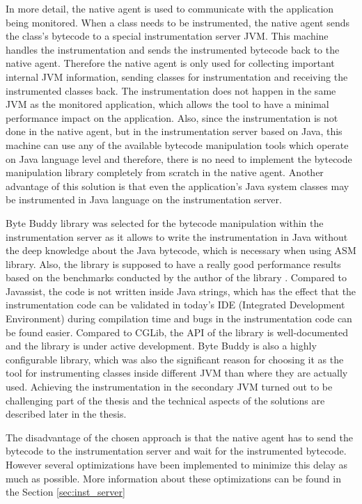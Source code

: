 In more detail, the native agent is used to communicate with the application being monitored. When a class needs to be instrumented, the native agent sends the class's bytecode to a special instrumentation server JVM. This machine handles the instrumentation and sends the instrumented bytecode back to the native agent. Therefore the native agent is only used for collecting important internal JVM information, sending classes for instrumentation and receiving the instrumented classes back. The instrumentation does not happen in the same JVM as the monitored application, which allows the tool to have a minimal performance impact on the application. Also, since the instrumentation is not done in the native agent, but in the instrumentation server based on Java, this machine can use any of the available bytecode manipulation tools which operate on Java language level and therefore, there is no need to implement the bytecode manipulation library completely from scratch in the native agent. Another advantage of this solution is that even the application's Java system classes may be instrumented in Java language on the instrumentation server.

Byte Buddy library was selected for the bytecode manipulation within the instrumentation server  as it allows to write the instrumentation in Java without the deep knowledge about the Java bytecode, which is necessary when using ASM library. Also, the library is supposed to have a really good performance results based on the benchmarks conducted by the author of the library \cite{ByteBuddy_Perf}. Compared to Javassist, the code is not written inside Java strings, which has the effect that the instrumentation code can be validated in today's IDE (Integrated Development Environment) during compilation time and bugs in the instrumentation code can be found easier. Compared to CGLib, the API of the library is well-documented and the library is under active development. Byte Buddy is also a highly configurable library, which was also the significant reason for choosing it as the tool for instrumenting classes inside different JVM than where they are actually used. Achieving the instrumentation in the secondary JVM  turned out to be challenging part of the thesis and the technical aspects of the solutions are described later in the thesis.

The disadvantage of the chosen approach is that the native agent has to send the bytecode to the instrumentation server and wait for the instrumented bytecode. However several optimizations have been implemented to minimize this delay as much as possible. More information about these optimizations can be found in the Section \ref{sec:inst_server}
			
